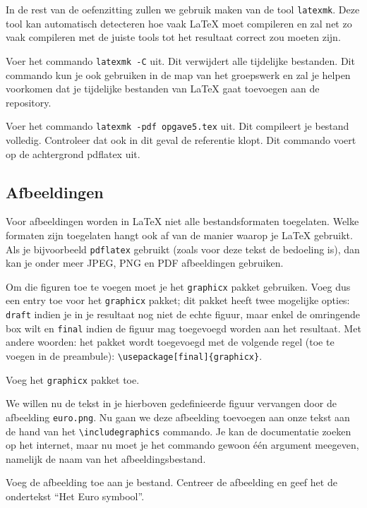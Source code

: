 \documentclass[12pt, dutch]{article}
\newcommand{\bs}{\textbackslash}
\begin{document}
In de rest van de oefenzitting zullen we gebruik maken van de tool
\texttt{latexmk}. Deze tool kan automatisch detecteren hoe vaak \LaTeX{} moet
compileren en zal net zo vaak compileren met de juiste tools tot het resultaat
correct zou moeten zijn.


\begin{tcolorbox}[title=Opgave 5e]
  Voer het commando \texttt{latexmk -C} uit. Dit verwijdert alle tijdelijke
  bestanden. Dit commando kun je ook gebruiken in de map van het groepswerk en
  zal je helpen voorkomen dat je tijdelijke bestanden van \LaTeX{} gaat
  toevoegen aan de repository.
\end{tcolorbox}
\begin{tcolorbox}[title=Opgave 5f]
  Voer het commando \texttt{latexmk -pdf opgave5.tex} uit. Dit compileert je
  bestand volledig. Controleer dat ook in dit geval de referentie klopt. Dit
  commando voert op de achtergrond pdflatex uit.
\end{tcolorbox}

\subsection{Afbeeldingen}

Voor afbeeldingen worden in \LaTeX{} niet alle bestandsformaten
toegelaten. Welke formaten zijn toegelaten hangt ook af van de manier
waarop je \LaTeX{} gebruikt. Als je bijvoorbeeld \texttt{pdflatex} gebruikt
(zoals voor deze tekst de bedoeling is), dan kan je onder meer JPEG,
PNG en PDF afbeeldingen gebruiken.

Om die figuren toe te voegen moet je het \texttt{graphicx} pakket
gebruiken. Voeg dus een entry toe voor het
\texttt{graphicx} pakket; dit pakket heeft twee mogelijke opties:
\texttt{draft} indien je in je resultaat nog niet de echte figuur, maar
enkel de omringende box wilt en \texttt{final} indien de figuur mag
toegevoegd worden aan het resultaat. Met andere woorden: het pakket
wordt toegevoegd met de volgende regel (toe te voegen in de
preambule): \texttt{\bs{}usepackage[final]\{graphicx\}}.

\begin{tcolorbox}[title=Opgave 5g]
  Voeg het \texttt{graphicx} pakket toe.
\end{tcolorbox}

We willen nu de tekst in je hierboven gedefinieerde figuur vervangen
door de afbeelding \texttt{euro.png}. Nu gaan we deze afbeelding toevoegen
aan onze tekst aan de hand van het \texttt{\bs{}includegraphics}
commando. Je kan de documentatie zoeken op het internet, maar nu moet je het commando
gewoon \'e\'en argument meegeven, namelijk de naam van het
afbeeldingsbestand.
\begin{tcolorbox}[title=Opgave 5h]
  Voeg de afbeelding toe aan je bestand. Centreer de afbeelding en geef het de
  ondertekst ``Het Euro symbool''.
\end{tcolorbox}
\end{document}
